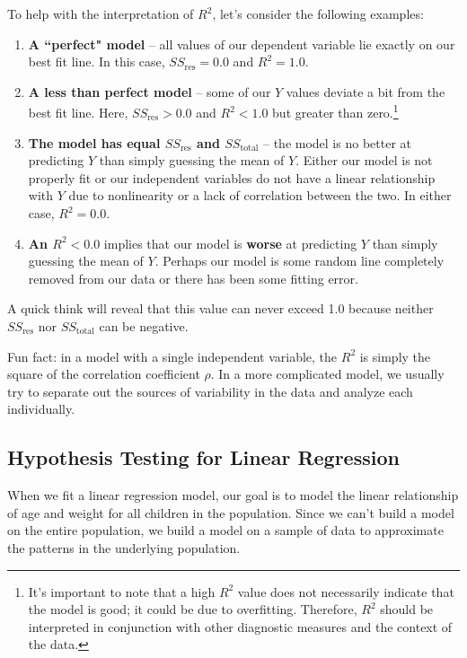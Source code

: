\documentclass{article}
\theoremstyle{definition}
\theoremstyle{theorem}
\theoremstyle{theorem}
\theoremstyle{theorem}
\theoremstyle{theorem}
\theoremstyle{definition}
\theoremstyle{definition}
\theoremstyle{definition}
\theoremstyle{definition}
\theoremstyle{definition}
\begin{document}
To help with the interpretation of \( R^2 \), let's consider the following examples:
\begin{enumerate}
    \item \textbf{A ``perfect" model} -- all values of our dependent variable lie exactly on our best fit line. In this case, \( SS_{\text{res}} = 0.0 \) and \( R^2 = 1.0 \).
    \item \textbf{A less than perfect model} -- some of our \( Y \) values deviate a bit from the best fit line. Here, \( SS_{\text{res}} > 0.0 \) and \( R^2 < 1.0 \) but greater than zero.\footnote{It's important to note that a high \( R^2 \) value does not necessarily indicate that the model is good; it could be due to overfitting. Therefore, \( R^2 \) should be interpreted in conjunction with other diagnostic measures and the context of the data.}
    \item \textbf{The model has equal \( SS_{\text{res}} \) and \( SS_{\text{total}} \)} -- the model is no better at predicting \( Y \) than simply guessing the mean of \( Y \). Either our model is not properly fit or our independent variables do not have a linear relationship with \( Y \) due to nonlinearity or a lack of correlation between the two. In either case, \( R^2 = 0.0 \).
    \item \textbf{An \( R^2 < 0.0 \)} implies that our model is \textbf{worse} at predicting \( Y \) than simply guessing the mean of \( Y \). Perhaps our model is some random line completely removed from our data or there has been some fitting error.
\end{enumerate}

A quick think will reveal that this value can never exceed 1.0 because neither $SS_{\text{res}}$ nor $SS_{\text{total}}$ can be negative.

Fun fact: in a model with a single independent variable, the \( R^2 \) is simply the square of the correlation coefficient $\rho$. In a more complicated model, we usually try to separate out the sources of variability in the data and analyze each individually.

\subsection{Hypothesis Testing for Linear Regression}

When we fit a linear regression model, our goal is to model the linear relationship of age and weight for all children in the population. Since we can't build a model on the entire population, we build a model on a sample of data to approximate the patterns in the underlying population.
\end{document}

